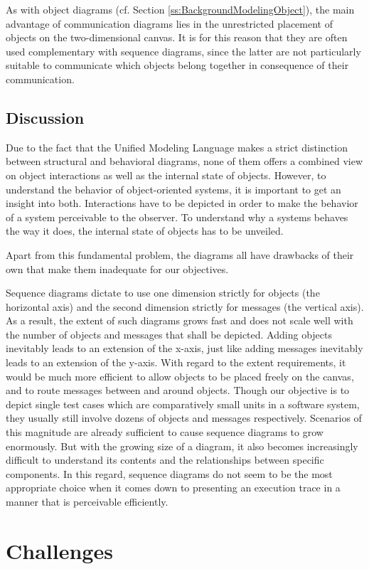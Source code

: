 As with object diagrams (cf. Section \ref{ss:BackgroundModelingObject}), the main advantage of communication diagrams lies in the unrestricted placement of objects on the two-dimensional canvas.
It is for this reason that they are often used complementary with sequence diagrams, since the latter are not particularly suitable to communicate which objects belong together in consequence of their communication.

\subsection{Discussion}
Due to the fact that the Unified Modeling Language makes a strict distinction between structural and behavioral diagrams, none of them offers a combined view on object interactions as well as the internal state of objects.
However, to understand the behavior of object-oriented systems, it is important to get an insight into both.
Interactions have to be depicted in order to make the behavior of a system perceivable to the observer.
To understand why a systems behaves the way it does, the internal state of objects has to be unveiled.

Apart from this fundamental problem, the diagrams all have drawbacks of their own that make them inadequate for our objectives.

Sequence diagrams dictate to use one dimension strictly for objects (the horizontal axis) and the second dimension strictly for messages (the vertical axis).
As a result, the extent of such diagrams grows fast and does not scale well with the number of objects and messages that shall be depicted.
Adding objects inevitably leads to an extension of the x-axis, just like adding messages inevitably leads to an extension of the y-axis.
With regard to the extent requirements, it would be much more efficient to allow objects to be placed freely on the canvas, and to route messages between and around objects.
Though our objective is to depict single test cases which are comparatively small units in a software system, they usually still involve dozens of objects and messages respectively.
Scenarios of this magnitude are already sufficient to cause sequence diagrams to grow enormously.
But with the growing size of a diagram, it also becomes increasingly difficult to understand its contents and the relationships between specific components.
In this regard, sequence diagrams do not seem to be the most appropriate choice when it comes down to presenting an execution trace in a manner that is perceivable efficiently.


\section{Challenges}
